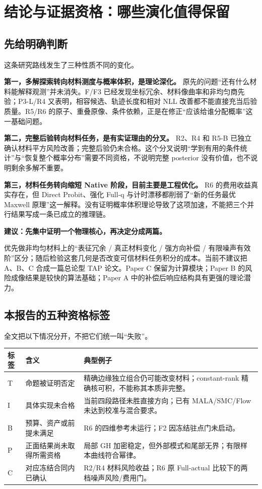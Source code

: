 \section{结论与证据资格：哪些演化值得保留}
\label{sec:decision}

\subsection{先给明确判断}
这条研究路线发生了三种性质不同的变化。

\textbf{第一，多解探索转向材料测度与概率体积，是理论深化。} 原先的问题“还有什么材料能解释观测”并未消失。F/F3 已经发现坐标冗余、材料像曲率和非均匀商先验；P3-L/R4 又表明，相容候选、轨迹长度和相对 NLL 改善都不能直接充当后验质量。R5/R6 的原子、重叠原像、条件依赖，正是在修正“应该给谁分配概率”这一基础问题。

\textbf{第二，完整后验转向材料任务，是有实证理由的分叉。} R2、R4 和 R5-B 已独立确认材料平方风险改善；完整后验仍未合格。这个分叉说明“学到有用的条件统计”与“恢复整个概率分布”需要不同资格，不说明完整 posterior 没有价值，也不说明剩余多解不重要。

\textbf{第三，材料任务转向缩短 Native 阶段，目前主要是工程优化。} R6 的费用收益真实存在，但 Direct Probit、强化 Full-q 与计时漂移都削弱了“新的任务最优 Maxwell 原理”这一解释。没有证明概率体积理论导致了这项加速，不能把三个并行结果写成一条已成立的推理链。

\begin{tcolorbox}
\textbf{建议：先集中证明一个物理核心，再决定分成两篇。}

优先做非均匀材料上的“表征冗余 / 真正材料变化 / 强方向补偿 / 有限噪声有效阶”区分；随后检验这套几何是否改变可信材料任务积分的成本。当前不建议把 A、B、C 合成一篇总论型 TAP 论文。Paper C 保留为计算模块；Paper B 的风险成像结果是较快的算法基础；Paper A 中的补偿后响应结构具有更强的理论潜力。
\end{tcolorbox}

\subsection{本报告的五种资格标签}
全文把以下情况分开，不把它们统一叫“失败”。

\begin{longtable}{p{.12\linewidth}p{.29\linewidth}p{.51\linewidth}}
\toprule
标签 & 含义 & 典型例子\\
\midrule
T & 命题被证明否定 & 精确边缘独立组合仍可能改变材料；constant-rank 精确核可积，不能称其本质非完整。\\
I & 具体实现未合格 & 当前四段路径未胜直接方向；已有 MALA/SMC/Flow 未达到校准与混合要求。\\
B & 预算、资产或前提未满足 & R6 的四维参考未运行；F2 因冻结驻点门未启动。\\
P & 正面结果尚未取得所需资格 & 局部 GH 加密稳定，但外部模式和尾部无界；有限样本曲线符合幂律。\\
C & 对应冻结合同内已确认 & R2/R4 材料风险收益；R6 原 Full-actual 比较下的两档噪声风险/费用门。\\
\bottomrule
\end{longtable}

